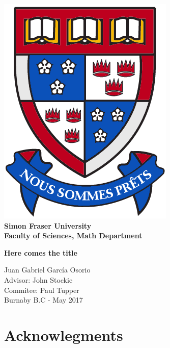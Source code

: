 \documentclass[12pt]{book}
\begin{document}
\setlength{\unitlength}{1 cm} %
\thispagestyle{empty}
\begin{center}
    \includegraphics[scale=0.5]{log.png} \\[1cm]
\textbf{{\LARGE Simon Fraser University}\\[0.5cm]
{\LARGE Faculty of Sciences, Math Department}}\\[1.25cm]
\begin{doublespace}
{\huge \textbf{Here comes the title}}\\[1.5cm]
\end{doublespace}
{\large Juan Gabriel Garc{\'i}a Osorio}\\[1cm]
Advisor: John Stockie\\[1cm]
Commitee: Paul Tupper\\[1cm]
Burnaby B.C - May  2017
\end{center}

\newpage
\tableofcontents


\chapter*{Acknowlegments}

\newpage


\end{document}
